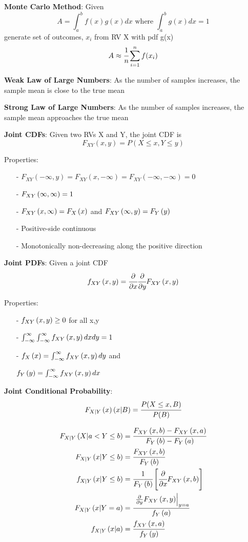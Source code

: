 \documentclass{article}
\newcommand{\sect}[1]{\noindent\textbf{#1}}
\begin{document}
\begin{small}
\begin{multicols*}{2}
	\sect{Monte Carlo Method}: Given
	\[ A = \int_{a}^{b} f(x)g(x)dx \text{ where } \int_a^b g(x)dx = 1 \]
	generate set of outcomes, $x_i$ from RV X with pdf g(x)
	\[ A \approx \cfrac{1}{n} \sum\limits_{i=1}^{n} f(x_i) \]
	
	\sect{Weak Law of Large Numbers}: As the number of samples increases, the sample mean is close to the true mean
	
	\sect{Strong Law of Large Numbers}: As the number of samples increases, the sample mean approaches the true mean
	
	\sect{Joint CDFs}: Given two RVs X and Y, the joint CDF is
	\[F_{XY}(x,y) = P(X\leq x, Y \leq y)\]
	\begin{scriptsize}
	Properties:
	\begin{itemize}
		\item[-] $F_{XY}(-\infty, y) = F_{XY}(x,-\infty) = F_{XY}(-\infty,-\infty) = 0$
		\item[-] $\cdf[XY][\infty, \infty] = 1$
		\item[-] $\cdf[XY][x, \infty] = \cdf[X][x]$ and $\cdf[XY][\infty, y]=\cdf[Y][y]$
		\item[-] Positive-side continuous
		\item[-] Monotonically non-decreasing along the positive direction
	\end{itemize}
	\end{scriptsize}

	\sect{Joint PDFs}: Given a joint CDF
	\[ \pdf[XY][x,y] = \cfrac{\partial}{\partial x}\cfrac{\partial}{\partial y} \cdf[XY][x,y] \]
	\begin{scriptsize}
		Properties:
		\begin{itemize}
			\item[-] $\pdf[XY][x,y] \geq 0$ for all x,y
			\item[-] $\int_{-\infty}^\infty\int_{-\infty}^\infty\pdf[XY][x,y]dxdy = 1$
			\item[-] $\pdf[X][x] = \int_{-\infty}^\infty \pdf[XY][x,y]dy$ and
			
			$\pdf[Y][y]=\int_{-\infty}^\infty \pdf[XY][x,y]dx$
		\end{itemize}
	\end{scriptsize}

	\sect{Joint Conditional Probability}:
	\[ \cdf[X|Y](x|B) = \cfrac{P(X\leq x, B)}{P(B)} \]
	\begin{scriptsize}
	\[
	\begin{aligned}
	\cdf[X|Y][X|a < Y \leq b] &= \cfrac{\cdf[XY][x,b]-\cdf[XY][x,a]}{\cdf[Y][b]-\cdf[Y][a]} \\
	\cdf[X|Y][x|Y \leq b] &= \cfrac{\cdf[XY][x,b]}{\cdf[Y][b]}\\
	\pdf[X|Y][x|Y \leq b] &= \cfrac{1}{\cdf[Y][b]}\left[\cfrac{\partial}{\partial x} \cdf[XY][x,b]\right]\\
	\cdf[X|Y][x|Y = a] &= \cfrac{\left.\frac{\partial}{\partial y} \cdf[XY][x,y]\right|_{y=a}}{\pdf[Y][a]}\\
	\pdf[X|Y][x|a] &= \cfrac{\pdf[XY][x,a]}{\pdf[Y][y]}
	\end{aligned}
	\]
	\end{scriptsize}
	\end{multicols*}




\end{small}
\end{document}
